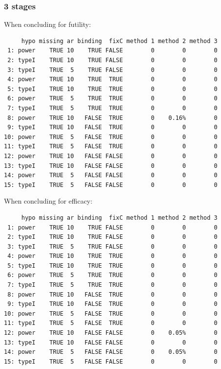 \documentclass[12pt]{article}
\begin{document}
\clearpage

\subsubsection{3 stages}
\label{sec:org2099d81}

When concluding for futility:
\begin{verbatim}
     hypo missing ar binding  fixC method 1 method 2 method 3
 1: power    TRUE 10    TRUE FALSE        0        0        0
 2: typeI    TRUE 10    TRUE FALSE        0        0        0
 3: typeI    TRUE  5    TRUE FALSE        0        0        0
 4: power    TRUE 10    TRUE  TRUE        0        0        0
 5: typeI    TRUE 10    TRUE  TRUE        0        0        0
 6: power    TRUE  5    TRUE  TRUE        0        0        0
 7: typeI    TRUE  5    TRUE  TRUE        0        0        0
 8: power    TRUE 10   FALSE  TRUE        0    0.16%        0
 9: typeI    TRUE 10   FALSE  TRUE        0        0        0
10: power    TRUE  5   FALSE  TRUE        0        0        0
11: typeI    TRUE  5   FALSE  TRUE        0        0        0
12: power    TRUE 10   FALSE FALSE        0        0        0
13: typeI    TRUE 10   FALSE FALSE        0        0        0
14: power    TRUE  5   FALSE FALSE        0        0        0
15: typeI    TRUE  5   FALSE FALSE        0        0        0
\end{verbatim}

When concluding for efficacy:
\begin{verbatim}
     hypo missing ar binding  fixC method 1 method 2 method 3
 1: power    TRUE 10    TRUE FALSE        0        0        0
 2: typeI    TRUE 10    TRUE FALSE        0        0        0
 3: typeI    TRUE  5    TRUE FALSE        0        0        0
 4: power    TRUE 10    TRUE  TRUE        0        0        0
 5: typeI    TRUE 10    TRUE  TRUE        0        0        0
 6: power    TRUE  5    TRUE  TRUE        0        0        0
 7: typeI    TRUE  5    TRUE  TRUE        0        0        0
 8: power    TRUE 10   FALSE  TRUE        0        0        0
 9: typeI    TRUE 10   FALSE  TRUE        0        0        0
10: power    TRUE  5   FALSE  TRUE        0        0        0
11: typeI    TRUE  5   FALSE  TRUE        0        0        0
12: power    TRUE 10   FALSE FALSE        0    0.05%        0
13: typeI    TRUE 10   FALSE FALSE        0        0        0
14: power    TRUE  5   FALSE FALSE        0    0.05%        0
15: typeI    TRUE  5   FALSE FALSE        0        0        0
\end{verbatim}
\end{document}
